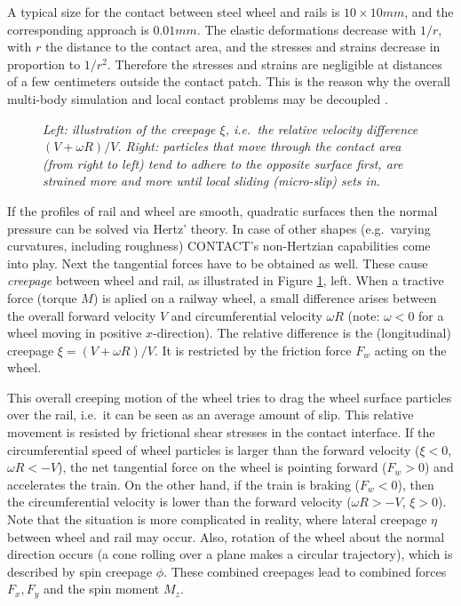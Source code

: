 \documentclass[12pt]{report}
\begin{document}
A typical size for the contact between steel wheel and rails is $10\times
10\unit{mm}$, and the corresponding approach is $0.01\unit{mm}$. The elastic
deformations decrease with $1/r$, with $r$ the distance to the contact area,
and the stresses and strains decrease in proportion to $1/r^2$. Therefore
the stresses and strains are negligible at distances of a few centimeters
outside the contact patch. This is the reason why the overall multi-body
simulation and local contact problems may be decoupled \cite{Kalker1990}.

\begin{figure}[bt]
\centering
{}
\hspace{5mm}
\caption{\em Left: illustration of the creepage $\xi$, i.e.\ the relative
velocity difference $(V+\omega R)/V$. Right: particles that move through the contact area (from right
to left) tend to adhere to the opposite surface first, are strained more
and more until local sliding (micro-slip) sets in.}
\label{fig:bent_tang}
\end{figure}

If the profiles of rail and wheel are smooth, quadratic surfaces then the
normal pressure can be solved via Hertz' theory. In case of other shapes
(e.g.\ varying curvatures, including roughness) CONTACT's non-Hertzian
capabilities come into play. Next the tangential forces have to be obtained
as well. These cause {\em creepage\/} between wheel and rail, as
illustrated in Figure \ref{fig:bent_tang}, left. When a tractive force
(torque $M$) is aplied on a railway wheel, a small difference arises
between the overall forward velocity $V$ and circumferential velocity
$\omega R$ (note: $\omega<0$ for a wheel moving in positive $x$-direction).
The relative difference is the (longitudinal) creepage $\xi=(V+\omega R)/V$.
It is restricted by the friction force $F_w$ acting on the wheel.

This overall creeping motion of the wheel tries to drag the wheel surface
particles over the rail, i.e.\ it can be seen as an average amount of slip.
This relative movement is resisted by frictional shear stresses in the
contact interface. If the circumferential speed of wheel particles is
larger than the forward velocity ($\xi<0$, $\omega R<-V$), the net
tangential force on the wheel is pointing forward ($F_w>0$) and accelerates
the train. On the other hand, if the train is braking ($F_w<0$), then the
circumferential velocity is lower than the forward velocity ($\omega R>-V$,
$\xi>0$). Note that the situation is more complicated in reality, where
lateral creepage $\eta$ between wheel and rail may occur. Also, rotation of
the wheel about the normal direction occurs (a cone rolling over a plane
makes a circular trajectory), which is described by spin creepage $\phi$.
These combined creepages lead to combined forces $F_x, F_y$ and the spin
moment $M_z$.
\end{document}
